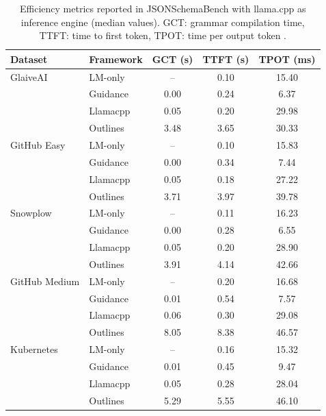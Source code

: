 \begin{table}[t]
\centering
\small
\setlength{\tabcolsep}{6pt}
\renewcommand{\arraystretch}{1.12}
\begin{tabular}{@{}l l c c c@{}}
\toprule
\textbf{Dataset} & \textbf{Framework} & \textbf{GCT (s)} & \textbf{TTFT (s)} & \textbf{TPOT (ms)} \\
\midrule
GlaiveAI      & LM-only   & --   & 0.10 & 15.40 \\
              & Guidance  & 0.00 & 0.24 & 6.37  \\
              & Llamacpp  & 0.05 & 0.20 & 29.98 \\
              & Outlines  & 3.48 & 3.65 & 30.33 \\
\midrule
GitHub Easy   & LM-only   & --   & 0.10 & 15.83 \\
              & Guidance  & 0.00 & 0.34 & 7.44  \\
              & Llamacpp  & 0.05 & 0.18 & 27.22 \\
              & Outlines  & 3.71 & 3.97 & 39.78 \\
\midrule
Snowplow      & LM-only   & --   & 0.11 & 16.23 \\
              & Guidance  & 0.00 & 0.28 & 6.55  \\
              & Llamacpp  & 0.05 & 0.20 & 28.90 \\
              & Outlines  & 3.91 & 4.14 & 42.66 \\
\midrule
GitHub Medium & LM-only   & --   & 0.20 & 16.68 \\
              & Guidance  & 0.01 & 0.54 & 7.57  \\
              & Llamacpp  & 0.06 & 0.30 & 29.08 \\
              & Outlines  & 8.05 & 8.38 & 46.57 \\
\midrule
Kubernetes    & LM-only   & --   & 0.16 & 15.32 \\
              & Guidance  & 0.01 & 0.45 & 9.47  \\
              & Llamacpp  & 0.05 & 0.28 & 28.04 \\
              & Outlines  & 5.29 & 5.55 & 46.10 \\
\bottomrule
\end{tabular}
\caption{Efficiency metrics reported in JSONSchemaBench with llama.cpp as inference engine (median values). GCT: grammar compilation time, TTFT: time to first token, TPOT: time per output token \cite{geng2025jsonschemabench}.}
\label{tab:jsonschemabench-eff-llamacpp}
\end{table}


